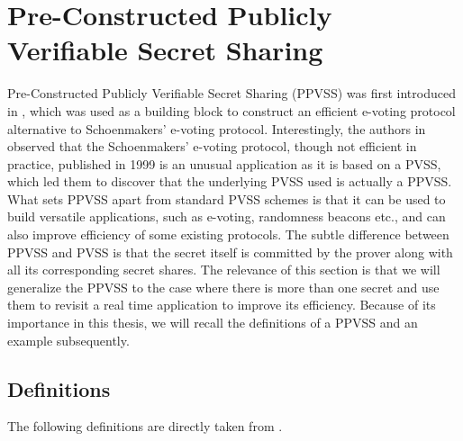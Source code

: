 \section{Pre-Constructed Publicly Verifiable Secret Sharing}
\label{sec:ppvss}
Pre-Constructed Publicly Verifiable Secret Sharing (PPVSS) was first introduced in 
\cite{cryptoeprint:2025/576}, which was used as a building block to 
construct an efficient e-voting protocol alternative to Schoenmakers' e-voting protocol. 
Interestingly, the authors in \cite{cryptoeprint:2025/576} observed that the Schoenmakers' e-voting protocol, though 
not efficient in practice, published in 1999 is an unusual application as it is based on a 
PVSS, which led them to discover that the underlying PVSS used is actually a PPVSS. 
What sets PPVSS apart from standard PVSS schemes is that it can be used to build versatile 
applications, such as e-voting, randomness beacons etc., and can 
also improve efficiency of some existing protocols. The subtle difference between PPVSS and 
PVSS is that the secret itself is committed by the prover along with all its corresponding 
secret shares. The relevance of this section is that we will generalize the PPVSS to the case 
where there is more than one secret and use them to revisit a real time application 
to improve its efficiency. Because of its importance in this thesis, we will recall the 
definitions of a PPVSS and an example subsequently.\par

\subsection{Definitions}
\label{sec:ppvss-definitions}

The following definitions are directly taken from \cite{cryptoeprint:2025/576}.

